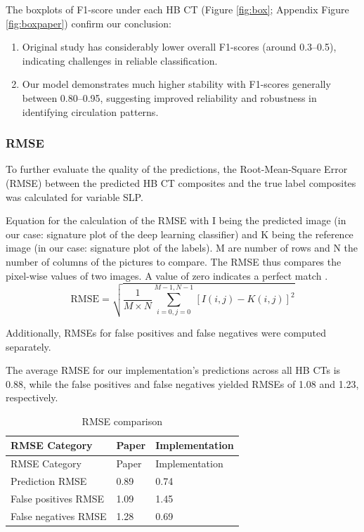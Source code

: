 \documentclass[
]{krantz}
\providecommand{\tightlist}{%
  \setlength{\itemsep}{0pt}\setlength{\parskip}{0pt}}
\begin{document}
The boxplots of F1-score under each HB CT (Figure \ref{fig:box}; Appendix Figure \ref{fig:boxpaper}) confirm our conclusion:

\begin{enumerate}
\def\labelenumi{\arabic{enumi}.}
\tightlist
\item
  Original study has considerably lower overall F1-scores (around 0.3--0.5), indicating challenges in reliable classification.
\item
  Our model demonstrates much higher stability with F1-scores generally between 0.80--0.95, suggesting improved reliability and robustness in identifying circulation patterns.
\end{enumerate}

\subsubsection{RMSE}\label{rmse}

To further evaluate the quality of the predictions, the Root-Mean-Square Error (RMSE) between the predicted HB CT composites and the true label composites was calculated for variable SLP.

Equation for the calculation of the RMSE with I being the predicted image (in our case: signature plot of the deep learning classifier) and K being the reference image (in our case: signature plot of the labels).
M are number of rows and N the number of columns
of the pictures to compare.
The RMSE thus compares the pixel-wise values of two images.
A value of zero indicates a perfect match \citep{Mittermeier2022, Mueller2020}.
\[\text{RMSE} = \sqrt{\frac{1}{M\times N}\sum_{i=0,j=0}^{M-1,N-1}[I(i,j)-K(i,j)]^2}\]

Additionally, RMSEs for false positives and false negatives were computed separately.

The average RMSE for our implementation's predictions across all HB CTs is 0.88,
while the false positives and false negatives yielded RMSEs of 1.08 and 1.23, respectively.

\begin{longtable}[]{@{}lll@{}}
\caption{RMSE comparison}\tabularnewline
\toprule\noalign{}
RMSE Category & Paper & Implementation \\
\midrule\noalign{}
\endfirsthead
\toprule\noalign{}
RMSE Category & Paper & Implementation \\
\midrule\noalign{}
\endhead
\bottomrule\noalign{}
\endlastfoot
Prediction RMSE & 0.89 & 0.74 \\
False positives RMSE & 1.09 & 1.45 \\
False negatives RMSE & 1.28 & 0.69 \\
\end{longtable}
\end{document}
